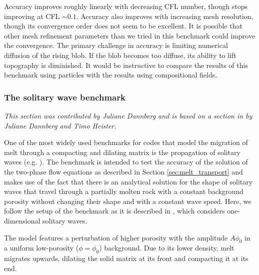 \documentclass{article}
\begin{document}
Accuracy improves roughly linearly with decreasing CFL number, though stops improving at CFL $\sim 0.1$.
Accuracy also improves with increasing mesh resolution, though its convergence order does not seem
to be excellent.  It is possible that other mesh refinement parameters than we tried in this benchmark
could improve the convergence. The primary challenge in accuracy is limiting numerical diffusion
of the rising blob. If the blob becomes too diffuse, its ability to lift topography is diminished.
It would be instructive to compare the results of this benchmark using particles with the
results using compositional fields.

\subsubsection{The solitary wave benchmark}
\label{sec:benchmark-solitary_wave}

\textit{This section was contributed by Juliane Dannberg and is based on a section in \cite{dannberg_melt} by Juliane Dannberg and Timo Heister.}

One of the most widely used benchmarks for codes that model the migration of melt through a compacting and dilating matrix is the propagation of solitary waves (e.g. \cite{SS11, KMK2013, Schm00}).
The benchmark is intended to test the accuracy of the solution of the two-phase flow equations as described in Section \ref{sec:melt_transport} and makes use of the fact that there is an analytical solution for the shape of solitary waves that travel through a partially molten rock with a constant background porosity without changing their shape and with a constant wave speed.
Here, we follow the setup of the benchmark as it is described in \cite{BR86}, which considers one-dimensional solitary waves.

The model features a perturbation of higher porosity with the amplitude $A \phi_0$ in a uniform low-porosity ($\phi=\phi_0$) background.  Due to its lower density, melt migrates upwards, dilating the solid matrix at its front and compacting it at its end.
\end{document}
